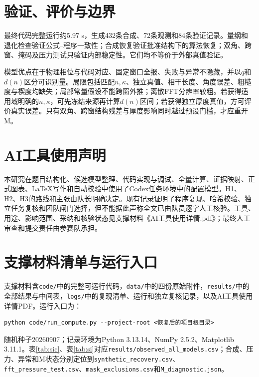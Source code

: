 \documentclass[UTF8,12pt,a4paper]{ctexart}
\begin{document}
\section{验证、评价与边界}
最终代码完整运行约5.97 s，生成432条合成、72条观测和84条验证记录。量纲和退化检查验证公式--程序一致性；合成恢复验证批准结构下的算法恢复；双角、跨窗、掩码及压力测试只验证内部稳定性。它们均不等价于外部真值验证。

模型优点在于物理相位与代码对应、固定窗口全报、失败与异常不隐藏，并以$q$和$d(n)$区分可识别量。局限包括匹配$n,\kappa$、独立真值、相干长度、角度误差、粗糙度与楔度均缺失；局部常量假设不能跨窗外推；离散FFT分辨率较粗。若获得适用域明确的$n,\kappa$，可先冻结来源再计算$d(n)$区间；若获得独立厚度真值，方可评价真实误差。只有双角、跨窗结构残差与厚度影响同时越过预设门槛，才应重开M。

\section*{AI工具使用声明}
本研究在题目结构化、候选模型整理、代码实现与调试、全量计算、证据映射、正式图表、LaTeX写作和自动校验中使用了Codex任务环境中的配置模型。H1、H2、H3的路线和主张由队长明确决定。现有记录证明了程序复现、哈希校验、独立任务复核和团队闸门选择，但不能据此声称全文已由队员逐字人工核验。工具、用途、影响范围、采纳和核验状态见支撑材料《AI工具使用详情.pdf》；最终人工审查和提交责任由参赛队承担。


\appendix
\section{支撑材料清单与运行入口}
支撑材料含\texttt{code/}中的完整可运行代码，\texttt{data/}中的四份原始附件，\texttt{results/}中的全部结果与中间表，\texttt{logs/}中的复现清单、运行和独立复核记录，以及AI工具使用详情PDF。运行入口为：
\begin{verbatim}
python code/run_compute.py --project-root <恢复后的项目根目录>
\end{verbatim}
随机种子20260907；记录环境为Python 3.13.14、NumPy 2.5.2、Matplotlib 3.11.1。表\ref{tab:sic}、表\ref{tab:si}对应\texttt{results/observed\_all\_models.csv}；合成、压力、异常和M状态分别定位到\texttt{synthetic\_recovery.csv}、\texttt{fft\_pressure\_test.csv}、\texttt{mask\_exclusions.csv}和\texttt{M\_diagnostic.json}。
\end{document}
